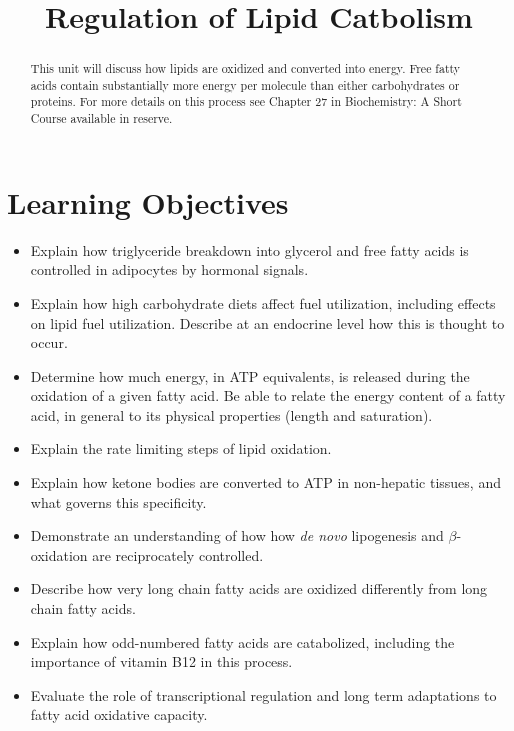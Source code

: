 \documentclass{tufte-handout}
\title{Regulation of Lipid Catbolism}
\author{}
\date{}  %
\begin{document}
\maketitle%

\begin{abstract}
\noindent  This unit will discuss how lipids are oxidized and converted into energy.  Free fatty acids contain substantially more energy per molecule than either carbohydrates or proteins.  For more details on this process see Chapter 27 in Biochemistry: A Short Course available in reserve\cite{Berg2015}.
\end{abstract}

\tableofcontents

\pagebreak
\section{Learning Objectives}

\begin{itemize}
\item Explain how triglyceride breakdown into glycerol and free fatty acids is controlled in adipocytes by hormonal signals.
\item Explain how high carbohydrate diets affect fuel utilization, including effects on lipid fuel utilization.  Describe at an endocrine level how this is thought to occur.
\item Determine how much energy, in ATP equivalents, is released during the oxidation of a given fatty acid.  Be able to relate the energy content of a fatty acid, in general to its physical properties (length and saturation).
\item Explain the rate limiting steps of lipid oxidation.
\item Explain how ketone bodies are converted to ATP in non-hepatic tissues, and what governs this specificity.
\item Demonstrate an understanding of how how \textit{de novo} lipogenesis and $\beta$-oxidation are reciprocately controlled.
\item Describe how very long chain fatty acids are oxidized differently from long chain fatty acids.
\item Explain how odd-numbered fatty acids are catabolized, including the importance of vitamin B12 in this process. 
\item Evaluate the role of transcriptional regulation and long term adaptations to fatty acid oxidative capacity.
\end{itemize}
\end{document}
